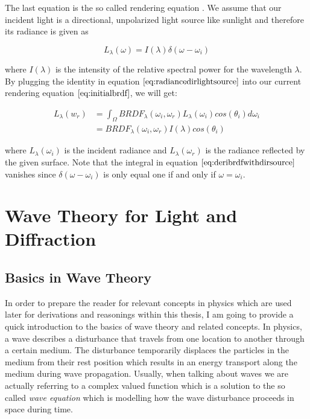 The last equation is the so called rendering equation $\label{sec:dirlighsourceassumption}$. We assume that our incident light is a directional, unpolarized light source like sunlight and therefore its radiance is given as 

\begin{equation}
 L_{\lambda}(\omega)=I(\lambda)\delta(\omega-\omega_i)
\label{eq:radiancedirlightsource}
\end{equation}

where $I(\lambda)$ is the intensity of the relative spectral power for the wavelength $\lambda$. By plugging the identity in equation $\ref{eq:radiancedirlightsource}$ into our current rendering equation $\ref{eq:initialbrdf}$, we will get:

\begin{align}
L_{\lambda}(w_r) 
& = \int_{\Omega} BRDF_{\lambda}(\omega_i, \omega_r) L_{\lambda}(\omega_i) cos(\theta_i) d\omega_i \nonumber \\
& = BRDF_{\lambda}(\omega_i, \omega_r) I(\lambda) cos(\theta_i)
\label{eq:deribrdfwithdirsource}
\end{align}

where $L_{\lambda}(\omega_i)$ is the incident radiance and $L_{\lambda}(\omega_r)$ is the radiance reflected by the given surface. Note that the integral in equation $\ref{eq:deribrdfwithdirsource}$ vanishes since $\delta(\omega-\omega_i)$ is only equal one if and only if $\omega = \omega_i$. 

\section{Wave Theory for Light and Diffraction}
\subsection{Basics in Wave Theory}
In order to prepare the reader for relevant concepts in physics which are used later for derivations and reasonings within this thesis, I am going to provide a quick introduction to the basics of wave theory and related concepts. In physics, a wave describes a disturbance that travels from one location to another through a certain medium. The disturbance temporarily displaces the particles in the medium from their rest position which results in an energy transport along the medium during wave propagation. Usually, when talking about waves we are actually referring to a complex valued function which is a solution to the so called \emph{wave equation} which is modelling how the wave disturbance proceeds in space during time. \\

